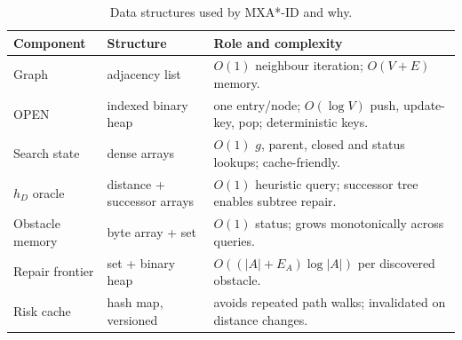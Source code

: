 \begin{table}[t]
\centering
\caption{Data structures used by MXA*-ID and why.}
\label{tab:structures}
\footnotesize
\begin{tabular}{p{1.45cm}p{1.6cm}p{3.4cm}}
\toprule
Component & Structure & Role and complexity \\
\midrule
Graph & adjacency list & $O(1)$ neighbour iteration; $O(V+E)$ memory. \\
OPEN & indexed binary heap & one entry/node; $O(\log V)$ push, update-key, pop; deterministic keys. \\
Search state & dense arrays & $O(1)$ $g$, parent, closed and status lookups; cache-friendly. \\
$h_D$ oracle & distance + successor arrays & $O(1)$ heuristic query; successor tree enables subtree repair. \\
Obstacle memory & byte array + set & $O(1)$ status; grows monotonically across queries. \\
Repair frontier & set + binary heap & $O((|A|+E_A)\log|A|)$ per discovered obstacle. \\
Risk cache & hash map, versioned & avoids repeated path walks; invalidated on distance changes. \\
\bottomrule
\end{tabular}
\end{table}
